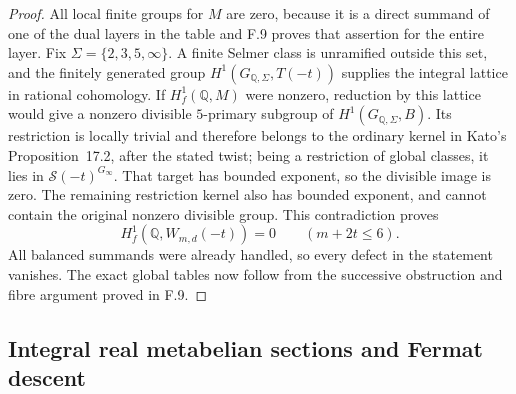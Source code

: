 \begin{proof}
All local finite groups for $M$ are zero, because it is a
direct summand of one of the dual layers in the table and
F.9 proves that assertion for the entire layer. Fix
$\Sigma=\{2,3,5,\infty\}$. A finite Selmer class is
unramified outside this set, and the finitely generated
group $H^1(G_{\mathbb Q,\Sigma},T(-t))$ supplies the integral
lattice in rational cohomology. If
$H_f^1(\mathbb Q,M)$ were nonzero, reduction by this lattice
would give a nonzero divisible $5$-primary subgroup of
$H^1(G_{\mathbb Q,\Sigma},B)$.
Its restriction is locally trivial and therefore belongs
to the ordinary kernel in Kato's Proposition~17.2, after
the stated twist; being a restriction of global classes,
it lies in $\mathcal S(-t)^{G_\infty}$.
That target has bounded exponent, so the divisible image
is zero. The remaining restriction kernel also has bounded
exponent, and cannot contain the original nonzero divisible
group. This contradiction proves
\[
 H_f^1(\mathbb Q,W_{m,d}(-t))=0
        \qquad(m+2t\le6).
\]
All balanced summands were already handled, so every defect
in the statement vanishes. The exact global tables now
follow from the successive obstruction and fibre argument
proved in F.9.
\end{proof}

\subsection{Integral real metabelian sections and Fermat descent}

